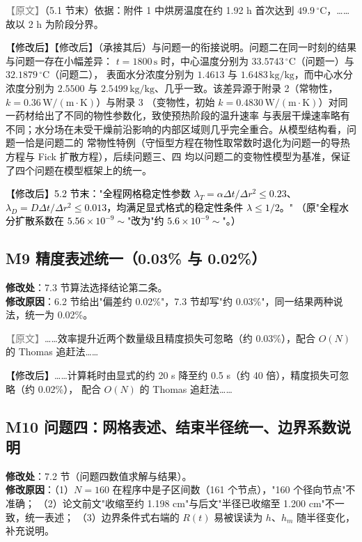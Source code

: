 \documentclass[UTF8,zihao=-4]{ctexart}
\newcommand{\yuanduan}[1]{\par\noindent\textcolor{gray}{\small 【原文】}#1\par}
\newcommand{\xinduan}[1]{\par\noindent\textcolor{black}{\small 【修改后】}#1\par}
\begin{document}
\yuanduan{\small （5.1 节末）依据：附件 1 中烘房温度在约 1.92 h 首次达到 $49.9\,{}^\circ$C，……故以 2 h 为阶段分界。}
\xinduan{\small 【修改后】（承接其后）与问题一的衔接说明。问题二在同一时刻的结果与问题一存在小幅差异：
$t=1800\,\mathrm{s}$ 时，中心温度分别为 $33.5743\,{}^\circ$C（问题一）与 $32.1879\,{}^\circ$C（问题二），
表面水分浓度分别为 $1.4613$ 与 $1.6483\,\mathrm{kg/kg}$，而中心水分浓度分别为 $2.5500$ 与
$2.5499\,\mathrm{kg/kg}$、几乎一致。该差异源于附录 2（常物性，$k=0.36\,\mathrm{W/(m\cdot K)}$）与附录 3
（变物性，初始 $k=0.4830\,\mathrm{W/(m\cdot K)}$）对同一药材给出了不同的物性参数化，致使预热阶段的温升速率
与表层干燥速率略有不同；水分场在未受干燥前沿影响的内部区域则几乎完全重合。从模型结构看，问题一恰是问题二的
常物性特例（守恒型方程在物性取常数时退化为问题一的导热方程与 Fick 扩散方程），后续问题三、四
均以问题二的变物性模型为基准，保证了四个问题在模型框架上的统一。}

\noindent\textcolor{black}{\small 【修改后】5.2 节末："全程网格稳定性参数 $\lambda_T=\alpha\Delta t/\Delta r^2\le0.23$、
$\lambda_D=D\Delta t/\Delta r^2\le0.013$，均满足显式格式的稳定性条件 $\lambda\le1/2$。"
（原"全程水分扩散系数在 $5.56\times10^{-9}\sim$"改为"约 $5.6\times10^{-9}\sim$"。）}

\subsection*{M9 精度表述统一（0.03\% 与 0.02\%）}

\textbf{修改处}：7.3 节算法选择结论第二条。\\
\textbf{修改原因}：6.2 节给出"偏差约 0.02\%"，7.3 节却写"约 0.03\%"，同一结果两种说法，统一为 0.02\%。

\yuanduan{……效率提升近两个数量级且精度损失可忽略（约 0.03\%），配合 $O(N)$ 的 Thomas 追赶法……}
\xinduan{……计算耗时由显式的约 20 s 降至约 0.5 s（约 40 倍），精度损失可忽略（约 0.02\%），
配合 $O(N)$ 的 Thomas 追赶法……}

\subsection*{M10 问题四：网格表述、结束半径统一、边界系数说明}

\textbf{修改处}：7.2 节（问题四数值求解与结果）。\\
\textbf{修改原因}：（1）$N=160$ 在程序中是子区间数（161 个节点），"160 个径向节点"不准确；
（2）论文前文"收缩至约 1.198 cm"与后文"半径已收缩至 1.200 cm"不一致，统一表述；
（3）边界条件式右端的 $R(t)$ 易被误读为 $h$、$h_m$ 随半径变化，补充说明。
\end{document}

